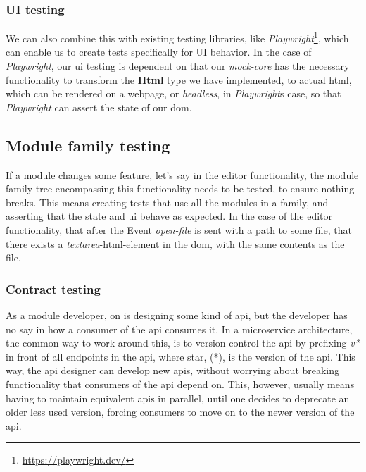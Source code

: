 \subsubsection{UI testing}

We can also combine this with existing testing libraries, like \textit{Playwright}\footnote{\url{https://playwright.dev/}},
which can enable us to create tests specifically for UI behavior. In the case of
\textit{Playwright}, our \gls*{ui} testing is dependent on that our
\textit{mock-core} has the necessary functionality to transform the
\textbf{Html} type we have implemented, to actual \gls*{html}, which can be
rendered on a webpage, or \textit{headless}, in \textit{Playwright}s case, so
that \textit{Playwright} can assert the state of our \gls*{dom}.

\subsection{Module family testing}

If a module changes some feature, let's say in the editor functionality, the
module family tree encompassing this functionality needs to be tested, to ensure
nothing breaks. This means creating tests that use all the modules in a family,
and asserting that the state and \gls*{ui} behave as expected. In the case of
the editor functionality, that after the Event \textit{open-file} is sent with
a path to some file, that there exists a \textit{textarea}-\gls*{html}-element in
the \gls*{dom}, with the same contents as the file.

\subsubsection{Contract testing}

As a module developer, on is designing some kind of \gls*{api}, but the developer
has no say in how a consumer of the \gls*{api} consumes it. In a microservice
architecture, the common way to work around this, is to version control the
\gls*{api} by prefixing \textit{v*} in front of all endpoints in the \gls*{api},
where star, (*), is the version of the \gls*{api}. This way, the \gls*{api}
designer can develop new \gls*{api}s, without worrying about breaking
functionality that consumers of the \gls*{api} depend on. This, however, usually
means having to maintain equivalent \gls*{api}s in parallel, until one decides
to deprecate an older less used version, forcing consumers to move on to the
newer version of the \gls*{api}.

